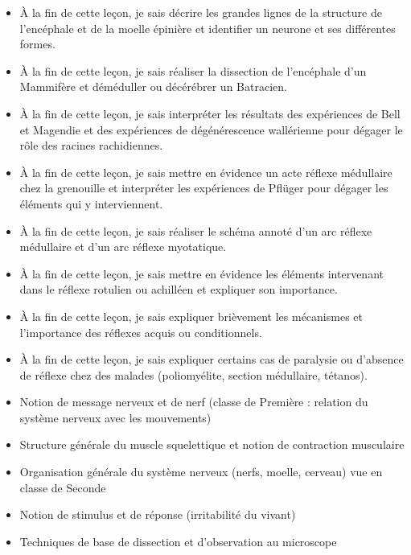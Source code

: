 \documentclass[11pt]{article}
\begin{document}
\begin{objectifs}
\begin{itemize}
\item À la fin de cette leçon, je sais décrire les grandes lignes de la structure de l'encéphale et de la moelle épinière et identifier un neurone et ses différentes formes.
\item À la fin de cette leçon, je sais réaliser la dissection de l'encéphale d'un Mammifère et déméduller ou décérébrer un Batracien.
\item À la fin de cette leçon, je sais interpréter les résultats des expériences de Bell et Magendie et des expériences de dégénérescence wallérienne pour dégager le rôle des racines rachidiennes.
\item À la fin de cette leçon, je sais mettre en évidence un acte réflexe médullaire chez la grenouille et interpréter les expériences de Pflüger pour dégager les éléments qui y interviennent.
\item À la fin de cette leçon, je sais réaliser le schéma annoté d'un arc réflexe médullaire et d'un arc réflexe myotatique.
\item À la fin de cette leçon, je sais mettre en évidence les éléments intervenant dans le réflexe rotulien ou achilléen et expliquer son importance.
\item À la fin de cette leçon, je sais expliquer brièvement les mécanismes et l'importance des réflexes acquis ou conditionnels.
\item À la fin de cette leçon, je sais expliquer certains cas de paralysie ou d'absence de réflexe chez des malades (poliomyélite, section médullaire, tétanos).
\end{itemize}
\end{objectifs}

\begin{prerequis}
\begin{itemize}
\item Notion de message nerveux et de nerf (classe de Première : relation du système nerveux avec les mouvements)
\item Structure générale du muscle squelettique et notion de contraction musculaire
\item Organisation générale du système nerveux (nerfs, moelle, cerveau) vue en classe de Seconde
\item Notion de stimulus et de réponse (irritabilité du vivant)
\item Techniques de base de dissection et d'observation au microscope
\end{itemize}
\end{prerequis}
\end{document}
